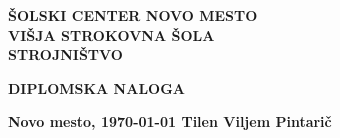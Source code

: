 \begin{titlepage}
	\begin{center}
		\textbf{\fontsize{20}{36}\selectfont
			ŠOLSKI CENTER NOVO MESTO\\
			VIŠJA STROKOVNA ŠOLA\\
			STROJNIŠTVO\\
		}

		\vspace*{3.2cm}
		\textbf{\fontsize{26}{39}\selectfont DIPLOMSKA NALOGA\\}
	\end{center}

	\vspace*{4cm}

	\vfill

	\textbf{\fontsize{18}{18}\selectfont
		Novo mesto,
		\monthyeardate\today
		\hfill
		Tilen Viljem Pintarič
	}
\end{titlepage}